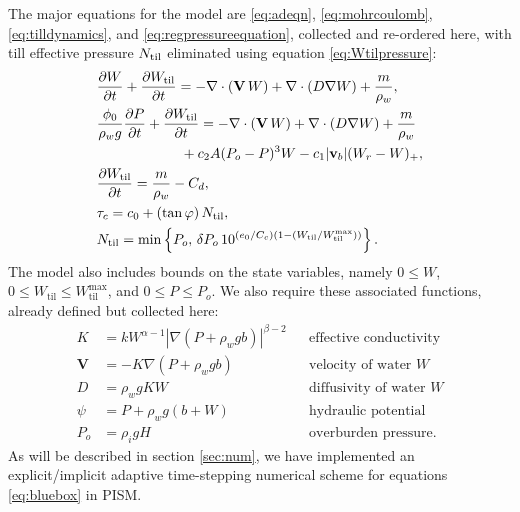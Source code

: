 \documentclass[gmd]{copernicus}   %
\newcommand{\text}{\textrm}
\newcommand\bv{\mathbf{v}}
\newcommand\bV{\mathbf{V}}
\newcommand{\ddt}[1]{\ensuremath{\frac{\partial #1}{\partial t}}}
\newcommand{\Div}{\nabla\cdot}
\newcommand{\grad}{\nabla}
\newcommand{\Wtil}{W_{\text{til}}}
\newcommand{\Wtilmax}{W_{\text{til}}^{\text{max}}}
\begin{document}
The major equations for the model are \eqref{eq:adeqn}, \eqref{eq:mohrcoulomb}, \eqref{eq:tilldynamics}, and \eqref{eq:regpressureequation}, collected and re-ordered here, with till effective pressure $\Ntil$ eliminated using equation \eqref{eq:Wtilpressure}:
\begin{align}
&\ddt{W} + \ddt{\Wtil} = - \Div\left(\bV\, W\right) + \Div \left(D \grad W\right) + \frac{m}{\rho_w}, \label{eq:bluebox} \\
&\frac{\phi_0}{\rho_w g} \ddt{P} + \ddt{\Wtil} = - \Div\left(\bV\, W\right) + \Div \left(D \grad W\right) + \frac{m}{\rho_w} \notag \\
& \qquad \qquad \qquad + c_2 A (P_o - P)^3 W - c_1 |\bv_b| (W_r - W)_+, \notag \\
&\frac{\partial \Wtil}{\partial t} = \frac{m}{\rho_w} - C_d, \notag \\
&\tau_c = c_0 + (\tan \varphi)\, \Ntil, \notag \\
&\Ntil = \min\left\{P_o,\, \delta P_o \, 10^{(e_0/C_c) \left(1 - (\Wtil/\Wtilmax)\right)}\right\}. \notag
\end{align}
The model also includes bounds on the state variables, namely $0\le W$, $0\le \Wtil \le \Wtilmax$, and $0 \le P \le P_o$.  We also require these associated functions, already defined but collected here:
\begin{align*}
K    &= k W^{\alpha-1} \left|\grad(P+\rho_w g b)\right|^{\beta-2} && \text{effective conductivity} \\
\bV  &= - K \grad\left(P + \rho_w g b\right) && \text{velocity of water $W$} \\
D    &= \rho_w g K W && \text{diffusivity of water $W$} \\
\psi &= P + \rho_w g (b + W) && \text{hydraulic potential} \\
P_o  &= \rho_i g H && \text{overburden pressure}.
\end{align*}
As will be described in section \ref{sec:num}, we have implemented an explicit/implicit adaptive time-stepping numerical scheme for equations \eqref{eq:bluebox} in PISM.
\end{document}
